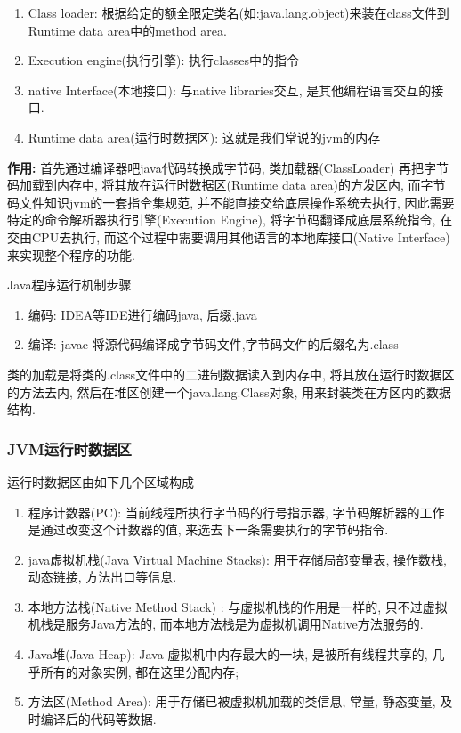 \documentclass[UTF8]{ctexart}
\begin{document}
\begin{enumerate}
	\item Class loader: 根据给定的额全限定类名(如:java.lang.object)来装在class文件到Runtime data area中的method area.
	\item Execution engine(执行引擎): 执行classes中的指令
	\item native Interface(本地接口): 与native libraries交互, 是其他编程语言交互的接口.
	\item Runtime data area(运行时数据区): 这就是我们常说的jvm的内存
\end{enumerate}
\par
\textbf{作用:} 首先通过编译器吧java代码转换成字节码, 类加载器(ClassLoader) 再把字节码加载到内存中, 将其放在运行时数据区(Runtime data area)的方发区内, 而字节码文件知识jvm的一套指令集规范, 并不能直接交给底层操作系统去执行, 因此需要特定的命令解析器执行引擎(Execution Engine), 将字节码翻译成底层系统指令, 在交由CPU去执行, 而这个过程中需要调用其他语言的本地库接口(Native Interface) 来实现整个程序的功能. 
\par
Java程序运行机制步骤
\begin{enumerate}
	\item 编码: IDEA等IDE进行编码java, 后缀.java
	\item 编译: javac 将源代码编译成字节码文件,字节码文件的后缀名为.class
\end{enumerate}
类的加载是将类的.class文件中的二进制数据读入到内存中, 将其放在运行时数据区的方法去内, 然后在堆区创建一个java.lang.Class对象, 用来封装类在方区内的数据结构.
\subsubsection{JVM运行时数据区}
运行时数据区由如下几个区域构成
\begin{enumerate}
	\item 程序计数器(PC): 当前线程所执行字节码的行号指示器, 字节码解析器的工作是通过改变这个计数器的值, 来选去下一条需要执行的字节码指令.
	\item java虚拟机栈(Java Virtual Machine Stacks): 用于存储局部变量表, 操作数栈, 动态链接, 方法出口等信息.
	\item 本地方法栈(Native Method Stack) : 与虚拟机栈的作用是一样的, 只不过虚拟机栈是服务Java方法的, 而本地方法栈是为虚拟机调用Native方法服务的.
	\item Java堆(Java Heap): Java 虚拟机中内存最大的一块, 是被所有线程共享的, 几乎所有的对象实例, 都在这里分配内存;
	\item 方法区(Method Area): 用于存储已被虚拟机加载的类信息, 常量, 静态变量, 及时编译后的代码等数据.
\end{enumerate}
\end{document}
